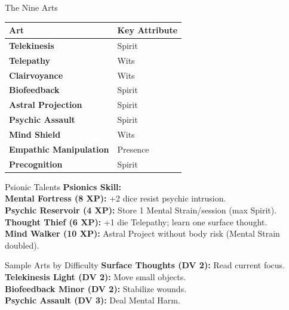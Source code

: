 \documentclass[10pt]{article}
\begin{document}
\begin{minipage}[t]{0.48\linewidth}
    \begin{charbox}{The Nine Arts}
        \begin{tabular}{>{\bfseries}p{3cm} p{4.5cm}}
            \toprule
            \textbf{Art} & \textbf{Key Attribute} \\
            \midrule
            Telekinesis & Spirit \\
            Telepathy & Wits \\
            Clairvoyance & Wits \\
            Biofeedback & Spirit \\
            Astral Projection & Spirit \\
            Psychic Assault & Spirit \\
            Mind Shield & Wits \\
            Empathic Manipulation & Presence \\
            Precognition & Spirit \\
            \bottomrule
        \end{tabular}
    \end{charbox}
    
    \vspace{0.5em}
    
    \begin{charbox}{Psionic Talents}
        \textbf{Psionics Skill:} \underline{\hspace{1.5cm}}\\
        \textbf{Mental Fortress (8 XP):} +2 dice resist psychic intrusion.\\
        \textbf{Psychic Reservoir (4 XP):} Store 1 Mental Strain/session (max Spirit).\\
        \textbf{Thought Thief (6 XP):} +1 die Telepathy; learn one surface thought.\\
        \textbf{Mind Walker (10 XP):} Astral Project without body risk (Mental Strain doubled).
    \end{charbox}
    
    \vspace{0.5em}
    
    \begin{charbox}{Sample Arts by Difficulty}
        \textbf{Surface Thoughts (DV 2):} Read current focus.\\
        \textbf{Telekinesis Light (DV 2):} Move small objects.\\
        \textbf{Biofeedback Minor (DV 2):} Stabilize wounds.\\
        \textbf{Psychic Assault (DV 3):} Deal Mental Harm.
    \end{charbox}
\end{minipage}
\end{document}
